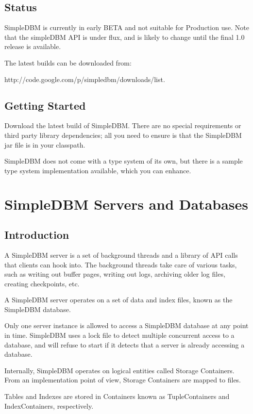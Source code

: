 \documentclass[a4paper,draft,oneside]{book}
\begin{document}
\section{Status}
SimpleDBM is currently in early BETA and not suitable for Production use. Note that the simpleDBM API is under flux, and is likely to change until the final 1.0 release is available. 

The latest builds can be downloaded from:

http://code.google.com/p/simpledbm/downloads/list.

\section{Getting Started}
Download the latest build of SimpleDBM.
There are no special requirements or third party library dependencies; all you
need to ensure is that the SimpleDBM jar file is in your classpath.

SimpleDBM does not come with a type system of its own, but there is a sample
type system implementation available, which you can enhance. 

\chapter{SimpleDBM Servers and Databases}

\section{Introduction}

A SimpleDBM server is a set of background threads and a library of API
calls that clients can hook into. The background threads take care of
various tasks, such as writing out buffer pages, writing out logs,
archiving older log files, creating checkpoints, etc.

A SimpleDBM server operates on a set of data and index files, known as
the SimpleDBM database.

Only one server instance is allowed to access a SimpleDBM database at
any point in time. SimpleDBM uses a lock file to detect multiple
concurrent access to a database, and will refuse to start if it
detects that a server is already accessing a database.

Internally, SimpleDBM operates on logical entities called Storage
Containers. From an implementation point of view, Storage Containers
are mapped to files. 

Tables and Indexes are stored in Containers known as TupleContainers
and IndexContainers, respectively.
\end{document}
